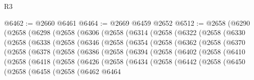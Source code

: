 \begin{lexlean}{R3}
\begin{coremodule}
@6462 := @2660 @6461
@6464 := @2669 @6459 @2652
@6512 := @2658
    (@6290
      (@2658
        (@6298
          (@2658
            (@6306
              (@2658
                (@6314
                  (@2658
                    (@6322
                      (@2658
                        (@6330
                          (@2658
                            (@6338
                              (@2658
                                (@6346
                                  (@2658
                                    (@6354
                                      (@2658
                                        (@6362
                                          (@2658
                                            (@6370
                                              (@2658
                                                (@6378
                                                  (@2658
                                                    (@6386
                                                      (@2658
                                                        (@6394
                                                          (@2658
                                                            (@6402
                                                              (@2658
                                                                (@6410
                                                                  (@2658
                                                                    (@6418
                                                                      (@2658
                                                                        (@6426
                                                                          (@2658
                                                                            (@6434
                                                                              (@2658
                                                                                (@6442
                                                                                  (@2658
                                                                                    (@6450
                                                                                      (@2658
                                                                                        (@6458
                                                                                          (@2658
                                                                                            (@6462
                                                                                              @6464

\end{coremodule}
\end{lexlean}
